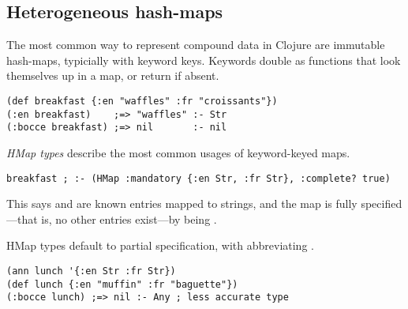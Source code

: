%
%
%

\subsection{Heterogeneous hash-maps}

The most common way to represent compound data in Clojure 
are immutable hash-maps, typicially with keyword keys.
%
Keywords double as functions that
look themselves up in a map, or return  if absent.
%
\begin{exmp}
\begin{verbatim}
(def breakfast {:en "waffles" :fr "croissants"})
(:en breakfast)    ;=> "waffles" :- Str
(:bocce breakfast) ;=> nil       :- nil
\end{verbatim}
\label{example:breakfastcomplete}
\end{exmp}

\emph{HMap types} describe the most common usages of
keyword-keyed maps.
\begin{verbatim}
breakfast ; :- (HMap :mandatory {:en Str, :fr Str}, :complete? true)
\end{verbatim}
This says
 and  are known entries mapped to strings,
and the map is fully specified---that is, no other entries exist---by  being .

HMap types default to partial specification, with
 abbreviating .
%
\begin{exmp}
\begin{verbatim}
(ann lunch '{:en Str :fr Str})
(def lunch {:en "muffin" :fr "baguette"})
(:bocce lunch) ;=> nil :- Any ; less accurate type
\end{verbatim}
\label{example:lunchpartial}
\end{exmp}

